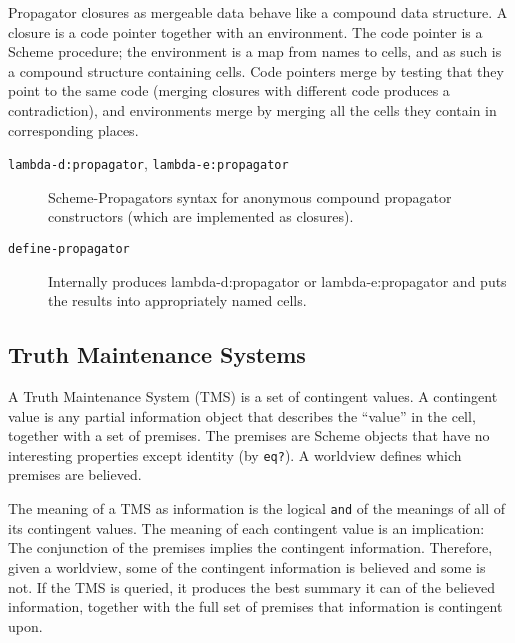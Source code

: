 \documentclass[12pt,letterpaper,english]{article}
\begin{document}
Propagator closures as mergeable data behave like a compound data
structure.  A closure is a code pointer together with an environment.
The code pointer is a Scheme procedure; the environment is a map from
names to cells, and as such is a compound structure containing cells.
Code pointers merge by testing that they point to the same code
(merging closures with different code produces a contradiction), and
environments merge by merging all the cells they contain in
corresponding places.
\begin{description}
\item[{\texttt{lambda-d:propagator}, \texttt{lambda-e:propagator}}] \leavevmode 
Scheme-Propagators syntax for anonymous compound propagator
constructors (which are implemented as closures).

\item[{\texttt{define-propagator}}] \leavevmode 
Internally produces lambda-d:propagator or lambda-e:propagator
and puts the results into appropriately named cells.

\end{description}



\hypertarget{truth-maintenance-systems}{}
\subsection{Truth Maintenance Systems}
\label{truth-maintenance-systems}

A Truth Maintenance System (TMS) is a set of contingent values.  A
contingent value is any partial information object that describes the
``value'' in the cell, together with a set of premises.  The premises
are Scheme objects that have no interesting properties except identity
(by \texttt{eq?}).  A worldview defines which premises are believed.

The meaning of a TMS as information is the logical \texttt{and} of the
meanings of all of its contingent values.  The meaning of each
contingent value is an implication: The conjunction of the premises
implies the contingent information.  Therefore, given a worldview,
some of the contingent information is believed and some is not.  If
the TMS is queried, it produces the best summary it can of the
believed information, together with the full set of premises that
information is contingent upon.
\end{document}
